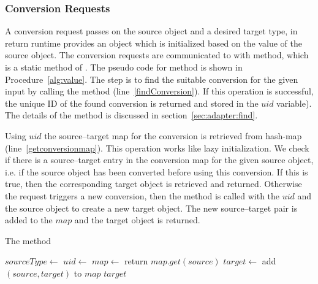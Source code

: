 \subsubsection{\zamk Conversion Requests}
\label{sec:adapter:convreq}
A conversion request passes on the source object and a desired target type, in return \zamk runtime provides an object which is initialized based on the value of the source object.
The conversion requests are communicated to \zamk with  method, which is a static method of .
The pseudo code for  method is shown in Procedure~\ref{alg:value}. 
The step is to find the suitable conversion for the given input by calling the  method (line~\ref{findConversion}).
 If this operation is successful, the unique ID of the found conversion is returned and stored in the $uid$ variable). The details of the  method is discussed in section~\ref{sec:adapter:find}. 
 
Using $uid$ the source--target map for the conversion is retrieved from  hash-map (line~\ref{getconversionmap}).
This operation works like lazy initialization. 
We check if there is a source--target entry in the conversion map for the given source object, i.e. if the source object has been converted before using this conversion. 
If this is true, then the corresponding target object is retrieved and returned.
Otherwise the request triggers a new conversion, then the  method is called with the $uid$ and the source object to create a new target object. 
The new source--target pair is added to the $map$ and the target object is returned.


\begin{algorithm}
\caption{The  method}\label{alg:value}
	\begin{algorithmic}[1]
		\State $sourceType \gets$ 
		\State $uid \gets$  \label{findConversion}
		\State $map \gets$  \label{getconversionmap}
			\State return $map.get(source)$ \label{existingconversion}
		\Else
			\State $target \gets$  \label{newconversion}
			\State add $(source, target)$ to $map$ \label{addtomap}
			\State \Return $target$
		\EndIf
		\EndProcedure
	\end{algorithmic}
\end{algorithm}

